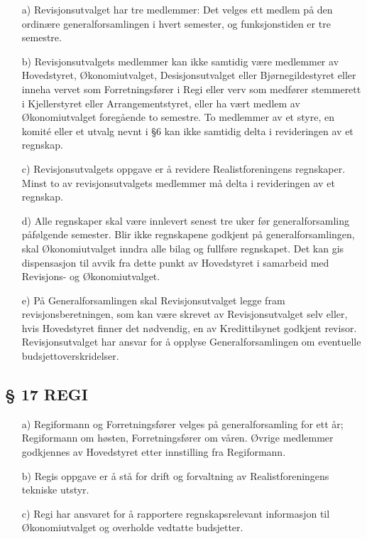 \begin{itemize}
\item[a)] Revisjonsutvalget har tre medlemmer: Det velges ett medlem på den ordinære
generalforsamlingen i hvert semester, og funksjonstiden er tre semestre.

\item[b)] Revisjonsutvalgets medlemmer kan ikke samtidig være medlemmer av
Hovedstyret, Økonomiutvalget, Desisjonsutvalget eller Bjørnegildestyret 
eller inneha vervet som Forretningsfører i Regi eller verv som
medfører stemmerett i Kjellerstyret eller Arrangementstyret, eller ha
vært medlem av Økonomiutvalget foregående to semestre. To medlemmer av et 
styre, en komité eller et utvalg nevnt i §6 kan ikke samtidig delta i 
revideringen av et regnskap.

\item[c)] Revisjonsutvalgets oppgave er å revidere Realistforeningens
regnskaper. Minst to av revisjonsutvalgets medlemmer må delta i
revideringen av et regnskap.

\item[d)] Alle regnskaper skal være innlevert senest tre uker før
generalforsamling påfølgende semester. Blir ikke regnskapene godkjent
på generalforsamlingen, skal Økonomiutvalget inndra alle bilag og
fullføre regnskapet. Det kan gis dispensasjon til avvik fra dette
punkt av Hovedstyret i samarbeid med Revisjons- og Økonomiutvalget.

\item[e)] På Generalforsamlingen skal Revisjonsutvalget legge fram
revisjonsberetningen, som kan være skrevet av Revisjonsutvalget selv
eller, hvis Hovedstyret finner det nødvendig, en av Kredittilsynet
godkjent revisor.  Revisjonsutvalget har ansvar for å opplyse
Generalforsamlingen om eventuelle budsjettoverskridelser.
\end{itemize}


\subsection*{§ 17 REGI}

\begin{itemize}
\item[a)] Regiformann og Forretningsfører velges på generalforsamling for ett
år; Regiformann om høsten, Forretningsfører om våren.  Øvrige
medlemmer godkjennes av Hovedstyret etter innstilling fra Regiformann.

\item[b)] Regis oppgave er å stå for drift og forvaltning av
Realistforeningens tekniske utstyr.

\item[c)] Regi har ansvaret for å rapportere regnskapsrelevant
  informasjon til Økonomiutvalget og overholde vedtatte budsjetter.
\end{itemize}


